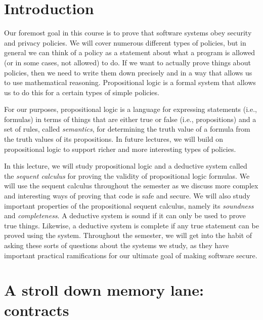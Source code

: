 \documentclass[11pt,twoside]{scrartcl}
\begin{document}
\maketitle
\thispagestyle{empty}


\section{Introduction}

Our foremost goal in this course is to prove that software systems obey security and privacy policies. We will cover numerous different types of policies, but in general we can think of a policy as a statement about what a program is allowed (or in some cases, not allowed) to do. If we want to actually prove things about policies, then we need to write them down precisely and in a way that allows us to use mathematical reasoning. Propositional logic is a formal system that allows us to do this for a certain types of simple policies. 

For our purposes, propositional logic is a language for expressing statements (i.e., formulas) in terms of things that are either true or false (i.e., propositions) and a set of rules, called \emph{semantics}, for determining the truth value of a formula from the truth values of its propositions. In future lectures, we will build on propositional logic to support richer and more interesting types of policies.

In this lecture, we will study propositional logic and a deductive system called the \emph{sequent calculus} for proving the validity of propositional logic formulas. 
We will use the sequent calculus throughout the semester as we discuss more complex and interesting ways of proving that code is safe and secure.
We will also study important properties of the propositional sequent calculus, namely its \emph{soundness} and \emph{completeness}. A deductive system is sound if it can only be used to prove true things. Likewise, a deductive system is complete if any true statement can be proved using the system. Throughout the semester, we will get into the habit of asking these sorts of questions about the systems we study, as they have important practical ramifications for our ultimate goal of making software secure.

\section{A stroll down memory lane: contracts}
\end{document}
